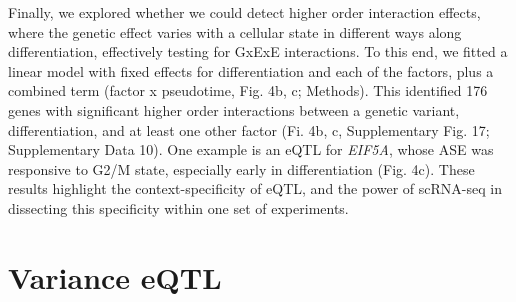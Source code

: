 Finally, we explored whether we could detect higher order interaction effects, where the genetic effect varies with a cellular state in different ways along differentiation, effectively testing for GxExE interactions. 
To this end, we fitted a linear model with fixed effects for differentiation and each of the factors, plus a combined term (factor x pseudotime, Fig. 4b, c; Methods). 
This identified 176 genes with significant higher order interactions between a genetic variant, differentiation, and at least one other factor (Fi. 4b, c, Supplementary Fig. 17; Supplementary Data 10). 
One example is an eQTL for \textit{EIF5A}, whose ASE was responsive to G2/M state, especially early in differentiation (Fig. 4c). 
These results highlight the context-specificity of eQTL, and the power of scRNA-seq in dissecting this specificity within one set of experiments.

\section{Variance eQTL}